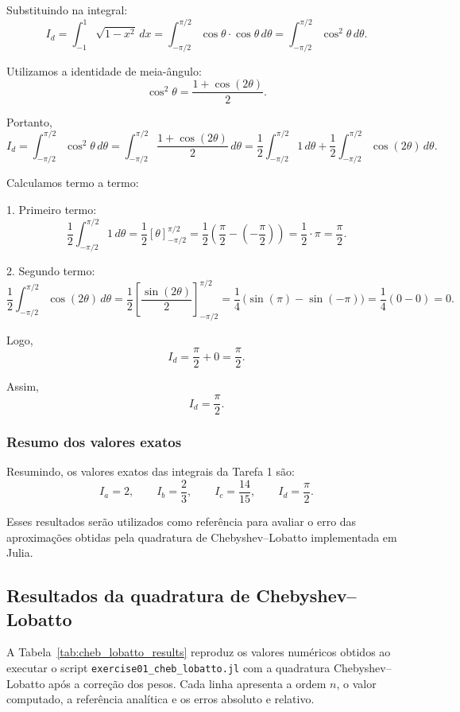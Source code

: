 \documentclass[12pt,a4paper]{article}
\begin{document}
Substituindo na integral:
\[
I_d = \int_{-1}^{1} \sqrt{1 - x^2} \, dx
    = \int_{-\pi/2}^{\pi/2} \cos\theta \cdot \cos\theta \, d\theta
    = \int_{-\pi/2}^{\pi/2} \cos^2\theta \, d\theta.
\]

Utilizamos a identidade de meia-ângulo:
\[
\cos^2\theta = \frac{1 + \cos(2\theta)}{2}.
\]

Portanto,
\[
I_d = \int_{-\pi/2}^{\pi/2} \cos^2\theta \, d\theta
    = \int_{-\pi/2}^{\pi/2} \frac{1 + \cos(2\theta)}{2} \, d\theta
    = \frac{1}{2} \int_{-\pi/2}^{\pi/2} 1\,d\theta
      + \frac{1}{2} \int_{-\pi/2}^{\pi/2} \cos(2\theta)\,d\theta.
\]

Calculamos termo a termo:

1. Primeiro termo:
\[
\frac{1}{2} \int_{-\pi/2}^{\pi/2} 1\,d\theta
= \frac{1}{2} \left[ \theta \right]_{-\pi/2}^{\pi/2}
= \frac{1}{2} \left( \frac{\pi}{2} - \left(-\frac{\pi}{2}\right)\right)
= \frac{1}{2} \cdot \pi
= \frac{\pi}{2}.
\]

2. Segundo termo:
\[
\frac{1}{2} \int_{-\pi/2}^{\pi/2} \cos(2\theta)\,d\theta
= \frac{1}{2} \left[ \frac{\sin(2\theta)}{2} \right]_{-\pi/2}^{\pi/2}
= \frac{1}{4}\,\bigl(\sin(\pi) - \sin(-\pi)\bigr)
= \frac{1}{4}(0 - 0)
= 0.
\]

Logo,
\[
I_d = \frac{\pi}{2} + 0 = \frac{\pi}{2}.
\]

Assim,
\[
\boxed{I_d = \dfrac{\pi}{2}}.
\]

\subsubsection{Resumo dos valores exatos}

Resumindo, os valores exatos das integrais da Tarefa 1 são:
\[
I_a = 2, \qquad
I_b = \frac{2}{3}, \qquad
I_c = \frac{14}{15}, \qquad
I_d = \frac{\pi}{2}.
\]

Esses resultados serão utilizados como referência para avaliar o erro das aproximações
obtidas pela quadratura de Chebyshev--Lobatto implementada em Julia.


\subsection{Resultados da quadratura de Chebyshev--Lobatto}
\label{subsec:cheb_lobatto_results}

A Tabela~\ref{tab:cheb_lobatto_results} reproduz os valores numéricos obtidos ao
executar o script \texttt{exercise01\_cheb\_lobatto.jl} com a quadratura
Chebyshev--Lobatto após a correção dos pesos. Cada linha apresenta a ordem $n$,
o valor computado, a referência analítica e os erros absoluto e relativo.
\end{document}
